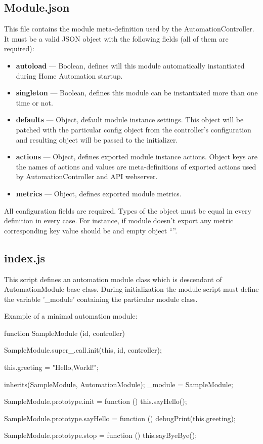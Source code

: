 \subsection{Module.json}

This file contains the module meta-definition used by the AutomationController. It must 
be a valid JSON object with the following fields (all of them are required):
\begin{itemize}
\item \textbf{autoload} — Boolean, defines will this module automatically instantiated during Home Automation startup.
\item \textbf{singleton} — Boolean, defines this module can be instantiated more than one time or not.
\item \textbf{defaults} — Object, default module instance settings. This object will be patched with the particular 
config object from the controller's configuration and resulting object will be passed to the initializer.
\item \textbf{actions} — Object, defines exported module instance actions. Object keys 
are the names of actions and  values are meta-definitions of exported actions used by 
AutomationController and API webserver.
\item \textbf{metrics} — Object, defines exported module metrics.
\end{itemize}
All configuration fields are required. Types of the object must be equal in every 
definition in every case. For instance, if module doesn't export any metric corresponding 
key value should be and empty object “{}”.

\subsection{index.js}
 
This script defines an automation module class which is descendant of AutomationModule base class.
During initialization the module script must define the variable '\_module' containing the particular module class.


Example of a minimal automation module:

\begin{listingverbatim}

function SampleModule (id, controller) {
SampleModule.super_.call.init(this, id, controller);

this.greeting = "Hello,World!";
}

inherits(SampleModule, AutomationModule);
_module = SampleModule;

SampleModule.prototype.init = function () {
    this.sayHello();
}

SampleModule.prototype.sayHello = function () {
    debugPrint(this.greeting);
} 

SampleModule.prototype.stop = function () {
    this.sayByeBye();
}    

\end{listingverbatim}
 
